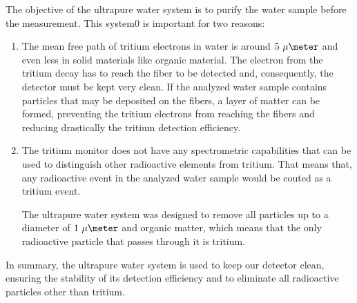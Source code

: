 The objective of the ultrapure water system is to purify the water sample before the measurement. This system0 is important for two reasons:

\begin{enumerate}

\item{} The mean free path of tritium electrons in water is around $5~\mu\meter$ and even less in solid materials like organic material. The electron from the tritium decay has to reach the fiber to be detected and, consequently, the detector must be kept very clean. If the analyzed water sample contains particles that may be deposited on the fibers, a layer of matter can be formed, preventing the tritium electrons from reaching the fibers and reducing drastically the tritium detection efficiency.

\item{} The tritium monitor does not have any spectrometric capabilities that can be used to distinguish other radioactive elements from tritium. That means that, any radioactive event in the analyzed water sample would be couted as a tritium event.

The ultrapure water system was designed to remove all particles up to a diameter of $1~\mu\meter$ and organic matter, which means that the only radioactive particle that passes through it is tritium. 


\end{enumerate}

In summary, the ultrapure water system is used to keep our detector clean, ensuring the stability of its detection efficiency and to eliminate all radioactive particles other than tritium. %